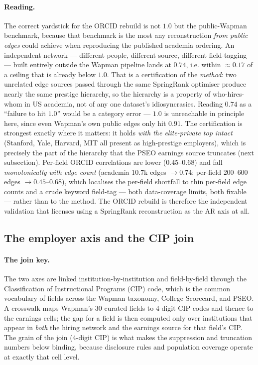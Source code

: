 \documentclass[11pt]{article}
\begin{document}
\paragraph{Reading.} The correct yardstick for the ORCID rebuild is not $1.0$ but the public-Wapman benchmark, because that benchmark is the most any reconstruction \emph{from public edges} could achieve when reproducing the published academia ordering. An independent network --- different people, different source, different field-tagging --- built entirely outside the Wapman pipeline lands at $0.74$, i.e. within $\approx 0.17$ of a ceiling that is already below $1.0$. That is a certification of the \emph{method}: two unrelated edge sources passed through the same SpringRank optimiser produce nearly the same prestige hierarchy, so the hierarchy is a property of who-hires-whom in US academia, not of any one dataset's idiosyncrasies. Reading $0.74$ as a ``failure to hit $1.0$'' would be a category error --- $1.0$ is unreachable in principle here, since even Wapman's own public edges only hit $0.91$. The certification is strongest exactly where it matters: it holds \emph{with the elite-private top intact} (Stanford, Yale, Harvard, MIT all present as high-prestige employers), which is precisely the part of the hierarchy that the PSEO earnings source truncates (next subsection). Per-field ORCID correlations are lower ($0.45$--$0.68$) and fall \emph{monotonically with edge count} (academia $10.7$k edges $\to 0.74$; per-field $200$--$600$ edges $\to 0.45$--$0.68$), which localises the per-field shortfall to thin per-field edge counts and a crude keyword field-tag --- both data-coverage limits, both fixable --- rather than to the method. The ORCID rebuild is therefore the independent validation that licenses using a SpringRank reconstruction as the AR axis at all.

\subsection{The employer axis and the CIP join}

\paragraph{The join key.} The two axes are linked institution-by-institution and field-by-field through the Classification of Instructional Programs (CIP) code, which is the common vocabulary of fields across the Wapman taxonomy, College Scorecard, and PSEO. A crosswalk maps Wapman's $30$ curated fields to $4$-digit CIP codes and thence to the earnings cells; the gap for a field is then computed only over institutions that appear in \emph{both} the hiring network and the earnings source for that field's CIP. The grain of the join (4-digit CIP) is what makes the suppression and truncation numbers below binding, because disclosure rules and population coverage operate at exactly that cell level.
\end{document}

